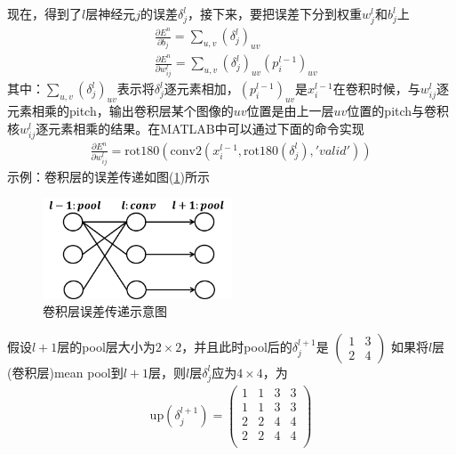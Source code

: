            \par
            现在，得到了$l$层神经元$j$的误差$\delta_j^l$，接下来，要把误差下分到权重$w_j^l$和$b_j^l$上
            \begin{align*}
            & \frac{\partial E^n}{\partial b_j} = \sum_{u,v} \left( \delta_j^l \right)_{uv} \\
            & \frac{\partial E^n}{\partial w_{ij}^l} = \sum_{u,v} \left( \delta_j^l \right)_{uv} \left( p_i^{l-1} \right)_{uv}
            \end{align*}
            其中：$ \sum_{u,v} \left( \delta_j^l \right)_{uv}$表示将$\delta_j^l$逐元素相加，$(p_i^{l-1})_{uv}$是$x_i^{l-1}$在卷积时候，与$w_{ij}^l$逐元素相乘的pitch，输出卷积层某个图像的$uv$位置是由上一层$uv$位置的pitch与卷积核$w_{ij}^l$逐元素相乘的结果。在MATLAB中可以通过下面的命令实现
            \begin{align*}
            \frac{\partial E^n}{\partial w_{ij}^l} = \mathrm{rot}180 (\mathrm{conv2}(x_i^{l-1},\mathrm{rot180}(\delta_j^l),'valid'))
            \end{align*}
            示例：卷积层的误差传递如图(\ref{fig:卷积层误差传递示意图})所示
            \begin{figure}[H]
            \centering
            \includegraphics[height=3cm]{images/Convolution_layer_error_transfer_diagram.jpg}
            \caption{卷积层误差传递示意图}
            \label{fig:卷积层误差传递示意图}
            \end{figure}
            假设$l+1$层的pool层大小为$2\times 2$，并且此时pool后的$\delta_j^{l+1}$是
            \begin{math}
            \left(
            \begin{smallmatrix}
            1 & 3\\
            2 & 4
            \end{smallmatrix}
            \right)
            \end{math}
            如果将$l$层(卷积层)mean pool到$l+1$层，则$l$层$\delta_j^l$应为$4\times 4$，为
            \begin{align*}
            \mathrm{up}(\delta_j^{l+1}) =
            \begin{pmatrix}
            1 & 1 & 3 & 3\\
            1 & 1 & 3 & 3\\
            2 & 2 & 4 & 4\\
            2 & 2 & 4 & 4\\
            \end{pmatrix}
            \end{align*}
